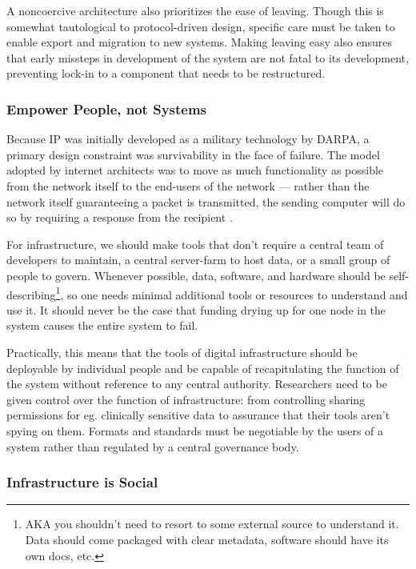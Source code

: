 \documentclass[10pt]{article}
\begin{document}
\begin{multicols}{2}
A noncoercive architecture also prioritizes the ease of leaving. Though
this is somewhat tautological to protocol-driven design, specific care
must be taken to enable export and migration to new systems. Making
leaving easy also ensures that early missteps in development of the
system are not fatal to its development, preventing lock-in to a
component that needs to be restructured.

\hypertarget{empower-people-not-systems}{%
\subsubsection{Empower People, not
Systems}\label{empower-people-not-systems}}

Because IP was initially developed as a military technology by DARPA, a
primary design constraint was survivability in the face of failure. The
model adopted by internet architects was to move as much functionality
as possible from the network itself to the end-users of the network ---
rather than the network itself guaranteeing a packet is transmitted, the
sending computer will do so by requiring a response from the recipient
\cite{clarkDesignPhilosophyDARPA1988} .

For infrastructure, we should make tools that don't require a central
team of developers to maintain, a central server-farm to host data, or a
small group of people to govern. Whenever possible, data, software, and
hardware should be self-describing\footnote{AKA you shouldn't need to
  resort to some external source to understand it. Data should come
  packaged with clear metadata, software should have its own docs, etc.},
so one needs minimal additional tools or resources to understand and use
it. It should never be the case that funding drying up for one node in
the system causes the entire system to fail.

Practically, this means that the tools of digital infrastructure should
be deployable by individual people and be capable of recapitulating the
function of the system without reference to any central authority.
Researchers need to be given control over the function of
infrastructure: from controlling sharing permissions for eg. clinically
sensitive data to assurance that their tools aren't spying on them.
Formats and standards must be negotiable by the users of a system rather
than regulated by a central governance body.

\hypertarget{infrastructure-is-social}{%
\subsubsection{Infrastructure is
Social}\label{infrastructure-is-social}}


\end{multicols}
\end{document}

